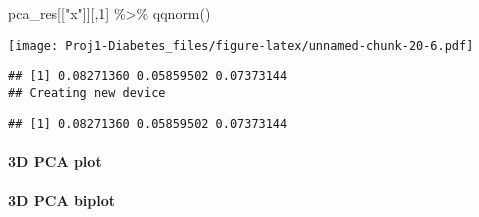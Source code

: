\documentclass[
]{article}
\newenvironment{Shaded}{\begin{snugshade}}{\end{snugshade}}
\newcommand{\AttributeTok}[1]{\textcolor[rgb]{0.77,0.63,0.00}{#1}}
\newcommand{\CommentTok}[1]{\textcolor[rgb]{0.56,0.35,0.01}{\textit{#1}}}
\newcommand{\ConstantTok}[1]{\textcolor[rgb]{0.00,0.00,0.00}{#1}}
\newcommand{\DecValTok}[1]{\textcolor[rgb]{0.00,0.00,0.81}{#1}}
\newcommand{\FloatTok}[1]{\textcolor[rgb]{0.00,0.00,0.81}{#1}}
\newcommand{\FunctionTok}[1]{\textcolor[rgb]{0.00,0.00,0.00}{#1}}
\newcommand{\NormalTok}[1]{#1}
\newcommand{\SpecialCharTok}[1]{\textcolor[rgb]{0.00,0.00,0.00}{#1}}
\newcommand{\StringTok}[1]{\textcolor[rgb]{0.31,0.60,0.02}{#1}}
\begin{document}
\begin{Shaded}
\begin{Highlighting}[]
\NormalTok{pca\_res[[}\StringTok{"x"}\NormalTok{]][,}\DecValTok{1}\NormalTok{] }\SpecialCharTok{\%\textgreater{}\%} \FunctionTok{qqnorm}\NormalTok{()}
\end{Highlighting}
\end{Shaded}

\texttt{[image: Proj1-Diabetes\_files/figure-latex/unnamed-chunk-20-6.pdf]}

\begin{Shaded}
\end{Shaded}

\begin{verbatim}
## [1] 0.08271360 0.05859502 0.07373144
## Creating new device
\end{verbatim}

\begin{Shaded}
\end{Shaded}

\begin{verbatim}
## [1] 0.08271360 0.05859502 0.07373144
\end{verbatim}

\hypertarget{d-pca-plot}{%
\paragraph{3D PCA plot}\label{d-pca-plot}}

\hypertarget{d-pca-biplot}{%
\paragraph{3D PCA biplot}\label{d-pca-biplot}}
\end{document}
